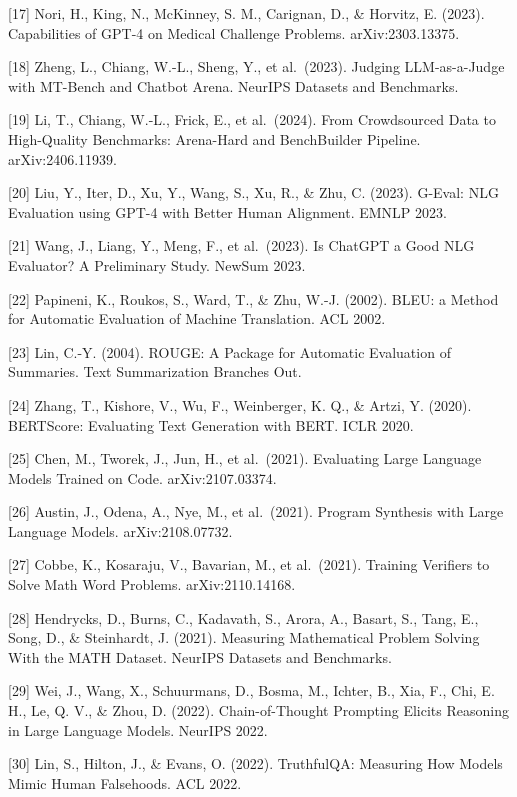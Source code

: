 {[}17{]} Nori, H., King, N., McKinney, S. M., Carignan, D., \& Horvitz, E. (2023). Capabilities of GPT-4 on Medical Challenge Problems. arXiv:2303.13375.

{[}18{]} Zheng, L., Chiang, W.-L., Sheng, Y., et al.~(2023). Judging LLM-as-a-Judge with MT-Bench and Chatbot Arena. NeurIPS Datasets and Benchmarks.

{[}19{]} Li, T., Chiang, W.-L., Frick, E., et al.~(2024). From Crowdsourced Data to High-Quality Benchmarks: Arena-Hard and BenchBuilder Pipeline. arXiv:2406.11939.

{[}20{]} Liu, Y., Iter, D., Xu, Y., Wang, S., Xu, R., \& Zhu, C. (2023). G-Eval: NLG Evaluation using GPT-4 with Better Human Alignment. EMNLP 2023.

{[}21{]} Wang, J., Liang, Y., Meng, F., et al.~(2023). Is ChatGPT a Good NLG Evaluator? A Preliminary Study. NewSum 2023.

{[}22{]} Papineni, K., Roukos, S., Ward, T., \& Zhu, W.-J. (2002). BLEU: a Method for Automatic Evaluation of Machine Translation. ACL 2002.

{[}23{]} Lin, C.-Y. (2004). ROUGE: A Package for Automatic Evaluation of Summaries. Text Summarization Branches Out.

{[}24{]} Zhang, T., Kishore, V., Wu, F., Weinberger, K. Q., \& Artzi, Y. (2020). BERTScore: Evaluating Text Generation with BERT. ICLR 2020.

{[}25{]} Chen, M., Tworek, J., Jun, H., et al.~(2021). Evaluating Large Language Models Trained on Code. arXiv:2107.03374.

{[}26{]} Austin, J., Odena, A., Nye, M., et al.~(2021). Program Synthesis with Large Language Models. arXiv:2108.07732.

{[}27{]} Cobbe, K., Kosaraju, V., Bavarian, M., et al.~(2021). Training Verifiers to Solve Math Word Problems. arXiv:2110.14168.

{[}28{]} Hendrycks, D., Burns, C., Kadavath, S., Arora, A., Basart, S., Tang, E., Song, D., \& Steinhardt, J. (2021). Measuring Mathematical Problem Solving With the MATH Dataset. NeurIPS Datasets and Benchmarks.

{[}29{]} Wei, J., Wang, X., Schuurmans, D., Bosma, M., Ichter, B., Xia, F., Chi, E. H., Le, Q. V., \& Zhou, D. (2022). Chain-of-Thought Prompting Elicits Reasoning in Large Language Models. NeurIPS 2022.

{[}30{]} Lin, S., Hilton, J., \& Evans, O. (2022). TruthfulQA: Measuring How Models Mimic Human Falsehoods. ACL 2022.

